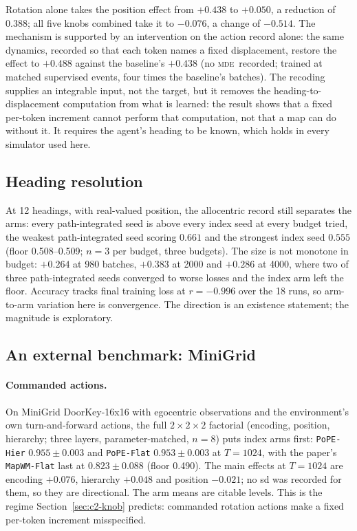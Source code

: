 \documentclass[10pt]{article}
\newcommand{\mde}{\textsc{mde}}
\newcommand{\arm}[1]{\texttt{#1}}
\begin{document}
Rotation alone takes the position effect from $+0.438$ to $+0.050$, a reduction of $0.388$; all five knobs
combined take it to $-0.076$, a change of $-0.514$. The mechanism is supported by an intervention on the
action record alone: the same dynamics, recorded so that each token names a fixed displacement, restore the
effect to $+0.488$ against the baseline's $+0.438$ (no \mde\ recorded; trained at matched supervised events,
four times the baseline's batches). The recoding supplies an integrable input, not the target, but it removes the heading-to-displacement
computation from what is learned: the result shows that a fixed per-token increment cannot perform that
computation, not that a map can do without it. It requires the agent's heading to be known, which holds in
every simulator used here. %

\subsection{Heading resolution}
\label{sec:c2-heading}

At 12 headings, with real-valued position, the allocentric record still separates the arms: every
path-integrated seed is above every index seed at every budget tried, the weakest path-integrated seed
scoring $0.661$ and the strongest index seed $0.555$ (floor 0.508--0.509; $n=3$ per budget, three
budgets). The size is not monotone in budget: $+0.264$ at 980 batches, $+0.383$ at 2000 and $+0.286$
at 4000, where two of three path-integrated seeds converged to worse losses and the index arm left the
floor. Accuracy tracks final training loss at $r=-0.996$ over the 18 runs, so arm-to-arm variation
here is convergence. The direction is an existence statement; the magnitude is exploratory.

\subsection{An external benchmark: MiniGrid}
\label{sec:c2-minigrid}

\paragraph{Commanded actions.} On MiniGrid DoorKey-16x16 with egocentric observations and the
environment's own turn-and-forward actions, the full $2\times2\times2$ factorial (encoding, position,
hierarchy; three layers, parameter-matched, $n=8$) puts index arms first: \arm{PoPE-Hier}
$0.955\pm0.003$ and \arm{PoPE-Flat} $0.953\pm0.003$ at $T=1024$, with the paper's \arm{MapWM-Flat}
last at $0.823\pm0.088$ (floor 0.490). The main effects at $T=1024$ are encoding $+0.076$, hierarchy
$+0.048$ and position $-0.021$; no sd was recorded for them, so they are directional. The arm means
are citable levels. This is the regime Section~\ref{sec:c2-knob} predicts: commanded rotation actions
make a fixed per-token increment misspecified. %
\end{document}
